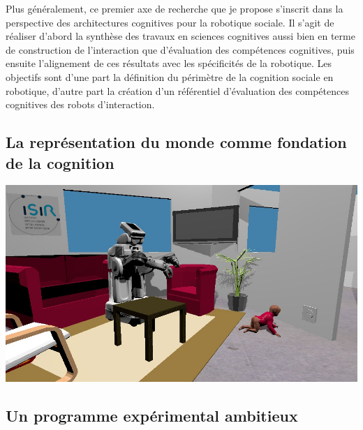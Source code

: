 \documentclass[a4paper]{article}
\begin{document}
Plus généralement, ce premier axe de recherche que je propose s'inscrit dans la
perspective des architectures cognitives pour la robotique sociale. Il s'agit de
réaliser d'abord la synthèse des travaux en sciences cognitives aussi bien en
terme de construction de l'interaction que d'évaluation des compétences
cognitives, puis ensuite l'alignement de ces résultats avec les spécificités de
la robotique. Les objectifs sont d'une part la définition du périmètre de la
cognition sociale en robotique, d'autre part la création d'un référentiel
d'évaluation des compétences cognitives des robots d'interaction.


\subsection{La représentation du monde comme fondation de la cognition}

\includegraphics[width=\textwidth]{figs/robots_home_baby_socket.jpg}

\subsection{Un programme expérimental ambitieux}




\printbibliography
\end{document}
